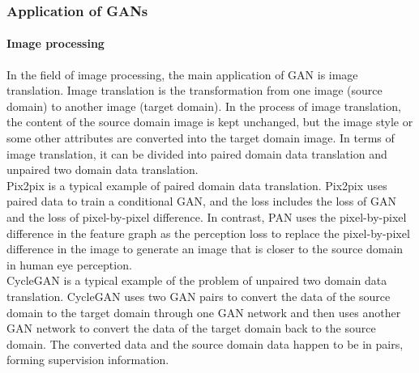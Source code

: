 \documentclass[11pt,a4paper]{article}
\begin{document}
\subsubsection{Application of GANs}
\paragraph{Image processing}
In the field of image processing, the main application of GAN is image translation. Image translation is the transformation from one image (source domain) to another image (target domain). In the process of image translation, the content of the source domain image is kept unchanged, but the image style or some other attributes are converted into the target domain image. In terms of image translation, it can be divided into paired domain data translation and unpaired two domain data translation.
\\
\newline
Pix2pix\citep{isola2017image} is a typical example of paired domain data translation. Pix2pix uses paired data to train a conditional GAN, and the loss includes the loss of GAN and the loss of pixel-by-pixel difference. In contrast, PAN\citep{wang2018perceptual} uses the pixel-by-pixel difference in the feature graph as the perception loss to replace the pixel-by-pixel difference in the image to generate an image that is closer to the source domain in human eye perception.
\\
\newline
CycleGAN\citep{zhu2017unpaired} is a typical example of the problem of unpaired two domain data translation. CycleGAN uses two GAN pairs to convert the data of the source domain to the target domain through one GAN network and then uses another GAN network to convert the data of the target domain back to the source domain. The converted data and the source domain data happen to be in pairs, forming supervision information.
\end{document}
